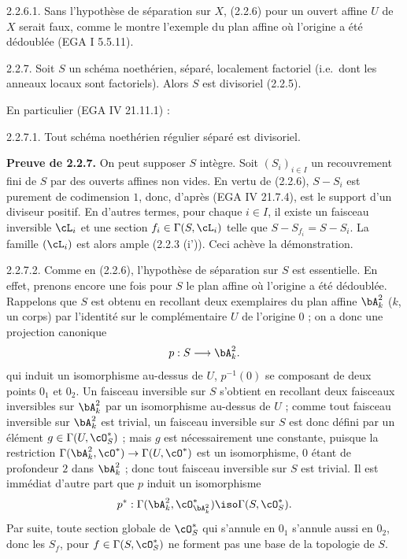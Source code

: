 \begin{remarque} 2.2.6.1.
Sans l'hypoth\`{e}se de s\'{e}paration sur $X$, (2.2.6) pour un ouvert affine $U$ de $X$ serait faux, comme le montre l'exemple du plan affine o\`{u} l'origine a \'{e}t\'{e} d\'{e}doubl\'{e}e (EGA I 5.5.11).
\end{remarque}

\begin{proposition} 2.2.7.
Soit $S$ un sch\'{e}ma noeth\'{e}rien, s\'{e}par\'{e}, localement factoriel (i.e.~dont les anneaux locaux sont factoriels). Alors $S$ est divisoriel (2.2.5).
\end{proposition}

En particulier (EGA IV 21.11.1) :

\begin{corollaire} 2.2.7.1.
Tout sch\'{e}ma noeth\'{e}rien r\'{e}gulier s\'{e}par\'{e} est divisoriel.
\end{corollaire}

\noindent\textbf{Preuve de 2.2.7.} On peut supposer $S$ int\`{e}gre. Soit $(S_i)_{i \in I}$ un recouvrement fini de $S$ par des ouverts affines non vides. En vertu de (2.2.6), $S - S_i$ est purement de codimension $1$, donc, d'apr\`{e}s (EGA IV 21.7.4), est le support d'un diviseur positif. En d'autres termes, pour chaque $i \in I$, il existe un faisceau inversible $\cL_i$ et une section $f_i \in \Gamma(S, \cL_i)$ telle que $S - S_{f_i} = S - S_i$. La famille $(\cL_i)$ est alors ample (2.2.3 (i')). Ceci ach\`{e}ve la d\'{e}monstration.

\begin{remarque} 2.2.7.2.
Comme en (2.2.6), l'hypoth\`{e}se de s\'{e}paration sur $S$ est essentielle. En effet, prenons encore une fois pour $S$ le plan affine o\`{u} l'origine a \'{e}t\'{e} d\'{e}doubl\'{e}e. Rappelons que $S$ est obtenu en recollant deux exemplaires du plan affine $\bA^2_k$ ($k$, un corps) par l'identit\'{e} sur le compl\'{e}mentaire $U$ de l'origine $0$ ; on a donc une projection canonique
\[
p : S \longrightarrow \bA^2_k .
\]
qui induit un isomorphisme au-dessus de $U$, $p^{-1}(0)$ se composant de deux points $0_1$ et $0_2$. Un faisceau inversible sur $S$ s'obtient en recollant deux faisceaux inversibles sur $\bA^2_k$ par un isomorphisme au-dessus de $U$ ; comme tout faisceau inversible sur $\bA^2_k$ est trivial, un faisceau inversible sur $S$ est donc d\'{e}fini par un \'{e}l\'{e}ment $g \in \Gamma(U, \cO_S^*)$ ; mais $g$ est n\'{e}cessairement une constante, puisque la restriction $\Gamma(\bA^2_k, \cO^*) \rightarrow \Gamma(U, \cO^*)$ est un isomorphisme, $0$ \'{e}tant de profondeur $2$ dans $\bA^2_k$ ; donc tout faisceau inversible sur $S$ est trivial. Il est imm\'{e}diat d'autre part que $p$ induit un isomorphisme
\[
p^* : \Gamma(\bA^2_k, \cO_{\bA^2_k}^*) \iso \Gamma(S, \cO_S^*) .
\]
Par suite, toute section globale de $\cO_S^*$ qui s'annule en $0_1$ s'annule aussi en $0_2$, donc les $S_f$, pour $f \in \Gamma(S, \cO_S^*)$ ne forment pas une base de la topologie de $S$.
\end{remarque}

